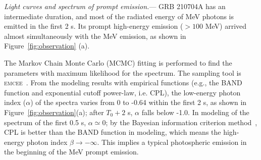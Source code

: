 \documentclass[linenumbers,twocolumn]{aastex631}
\begin{document}
\textit{Light curves and spectrum of prompt emission.}---
GRB 210704A has an intermediate duration, and most of the radiated energy of MeV photons is emitted in the first 2 s. Its prompt high-energy emission ($>100$ MeV) arrived almost simultaneously with the MeV emission, as shown in Figure~\ref{fig:observation} (a).

The Markov Chain Monte Carlo (MCMC) fitting is performed to find the parameters with maximum likelihood for the spectrum. The sampling tool is \textsc{emcee}~\citep{2013PASP..125..306F}.
From the modeling results with empirical functions (e.g., the BAND function and exponential cutoff power-law, i.e. CPL), the low-energy photon index ($\alpha$) of the spectra varies from 0 to -0.64 within the first 2 s, as shown in Figure~\ref{fig:observation}(a); after $T_0 +2$ s, $\alpha$ falls below -1.0.  In modeling of the spectrum of the first 0.5 s, $\alpha\simeq 0$; by the Bayesian information criterion method~\citep[BIC,][]{2016MNRAS.463.1144W}, CPL is better than the BAND function in modeling, which means the high-energy photon index $\beta\to-\infty$. This implies a typical photospheric emission in the beginning of the MeV prompt emission.
\end{document}
